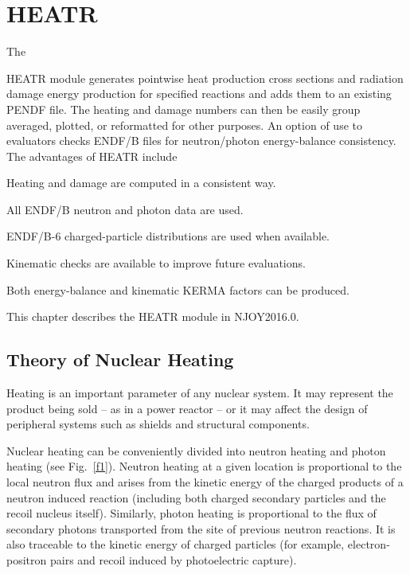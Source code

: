 \section{HEATR}
\label{sHEATR}

\hypertarget{sHEATRhy}{The}
HEATR module generates pointwise heat production
 cross sections and radiation damage
 energy production for specified reactions
and adds them to an existing PENDF file.  The heating
and damage numbers can then be easily group averaged, plotted, or
reformatted for other purposes.  An option of use to evaluators
checks ENDF/B files for neutron/photon energy-balance consistency.
  The advantages of HEATR include

\begin{itemize}
\begin{singlespace}
\item Heating and damage are computed in a consistent way.

\item All ENDF/B neutron and photon data are used.

\item ENDF/B-6 charged-particle distributions are used
       when available.

\item Kinematic checks are available to improve future evaluations.

\item Both energy-balance and kinematic KERMA factors can be produced.
\end{singlespace}
\end{itemize}

This chapter describes the HEATR module in NJOY2016.0.

\subsection{Theory of Nuclear Heating}
\label{ssHEART_theory}

Heating is an important parameter of any nuclear system.  It may
represent the product being sold -- as in a power reactor -- or it may
affect the design of peripheral systems such as shields and structural
components.

Nuclear heating can be conveniently divided into neutron heating and
photon heating (see Fig.~\ref{f1}).  Neutron heating at a given
location is proportional to the local neutron flux and arises from the
kinetic energy of the charged products of a neutron induced reaction
(including both charged secondary particles and the recoil nucleus
itself).  Similarly, photon heating is proportional to the flux
of secondary photons transported from the site of previous neutron
reactions.  It is also traceable to the kinetic energy of charged
particles (for example, electron-positron pairs and recoil induced
by photoelectric capture).


